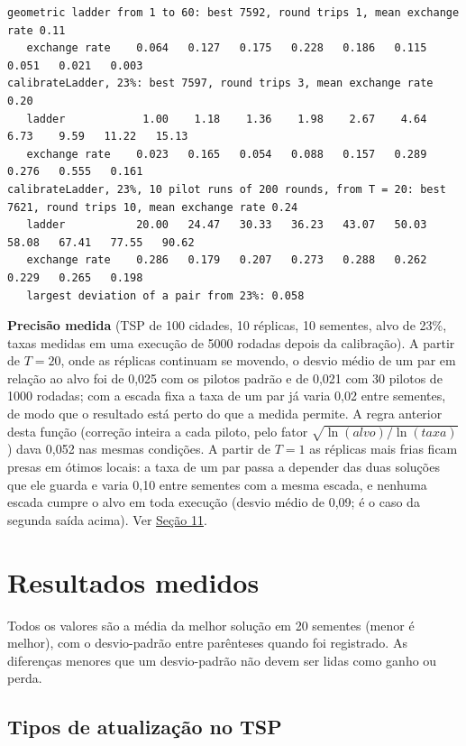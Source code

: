 \documentclass[10pt,a4paper]{article}
\begin{document}
\begin{lstlisting}[style=saida]
geometric ladder from 1 to 60: best 7592, round trips 1, mean exchange rate 0.11
   exchange rate    0.064   0.127   0.175   0.228   0.186   0.115   0.051   0.021   0.003
calibrateLadder, 23%: best 7597, round trips 3, mean exchange rate 0.20
   ladder            1.00    1.18    1.36    1.98    2.67    4.64    6.73    9.59   11.22   15.13
   exchange rate    0.023   0.165   0.054   0.088   0.157   0.289   0.276   0.555   0.161
calibrateLadder, 23%, 10 pilot runs of 200 rounds, from T = 20: best 7621, round trips 10, mean exchange rate 0.24
   ladder           20.00   24.47   30.33   36.23   43.07   50.03   58.08   67.41   77.55   90.62
   exchange rate    0.286   0.179   0.207   0.273   0.288   0.262   0.229   0.265   0.198
   largest deviation of a pair from 23%: 0.058
\end{lstlisting}

\begin{nota}
\textbf{Precisão medida} (TSP de 100 cidades, 10 réplicas, 10 sementes, alvo de 23\%, taxas medidas em uma execução de 5000 rodadas depois da calibração). A partir de $T = 20$, onde as réplicas continuam se movendo, o desvio médio de um par em relação ao alvo foi de 0,025 com os pilotos padrão e de 0,021 com 30 pilotos de 1000 rodadas; com a escada fixa a taxa de um par já varia 0,02 entre sementes, de modo que o resultado está perto do que a medida permite. A regra anterior desta função (correção inteira a cada piloto, pelo fator $\sqrt{\ln(\mathit{alvo})/\ln(\mathit{taxa})}$) dava 0,052 nas mesmas condições. A partir de $T = 1$ as réplicas mais frias ficam presas em ótimos locais: a taxa de um par passa a depender das duas soluções que ele guarda e varia 0,10 entre sementes com a mesma escada, e nenhuma escada cumpre o alvo em toda execução (desvio médio de 0,09; é o caso da segunda saída acima). Ver \hyperref[s11]{Seção 11}.
\end{nota}

\section{Resultados medidos}\label{s9}

Todos os valores são a média da melhor solução em 20 sementes (menor é melhor), com o desvio-padrão entre parênteses quando foi registrado. As diferenças menores que um desvio-padrão não devem ser lidas como ganho ou perda.

\subsection{Tipos de atualização no TSP}
\end{document}
